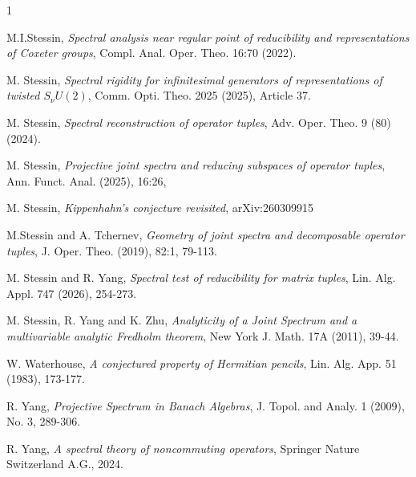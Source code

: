 \documentclass[draft, 12pt, reqno]{amsart}
\numberwithin{equation}{section}
\theoremstyle{plain}
\begin{document}
\begin{thebibliography}{1}



 M.I.Stessin, {\em Spectral analysis near regular point of reducibility and representations of Coxeter groups}, Compl. Anal. Oper. Theo. 16:70 (2022).
 
 M. Stessin, {\em Spectral rigidity for infinitesimal generators of representations of twisted $S_\nu U(2)$}, Comm. Opti. Theo. 2025 (2025), Article 37.

 M. Stessin, {\em Spectral reconstruction of operator tuples}, Adv. Oper. Theo. 9 (80) (2024). %

 M. Stessin, {\em Projective joint spectra and reducing subspaces of operator tuples}, Ann. Funct. Anal. (2025), 16:26,

 M. Stessin, {\em Kippenhahn's conjecture revisited}, arXiv:260309915

 M.Stessin and A. Tchernev, {\em Geometry of joint spectra and decomposable operator tuples}, J. Oper. Theo. (2019), {82:1}, 79-113.

 M. Stessin and R. Yang, {\em Spectral test of reducibility for matrix tuples}, Lin. Alg. Appl. 747 (2026), 254-273. 

 M. Stessin, R. Yang and K. Zhu, {\em Analyticity of a Joint Spectrum and a multivariable analytic Fredholm theorem}, New York J. Math. 17A (2011), 39-44.

 W. Waterhouse, {\em A conjectured property of Hermitian pencils}, Lin. Alg. App. 51 (1983), 173-177.


 R. Yang, {\em Projective Spectrum in Banach Algebras}, J. Topol. and Analy. 1 (2009), No. 3, 289-306.

 R. Yang, {\em A spectral theory of noncommuting operators}, Springer Nature Switzerland A.G., 2024.

\end{thebibliography}
\end{document}
